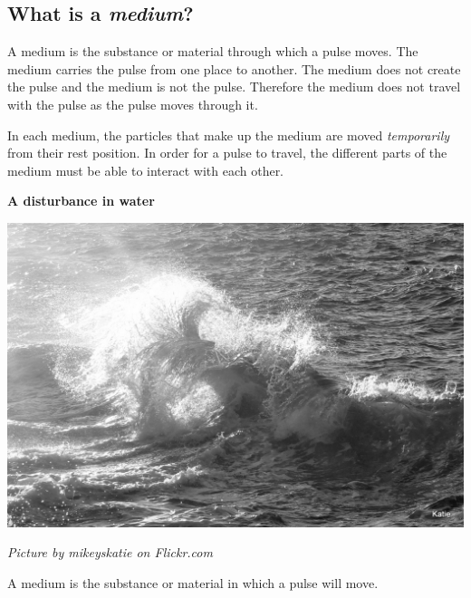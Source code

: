             \subsection*{What is a \textsl{medium}?}
            \nopagebreak
\begin{minipage}{.5\textwidth}
      \label{m38801*id312816}A medium is the substance or material through which a pulse moves. The medium carries the pulse from one place to another. The medium does not create the pulse and the medium is not the pulse. Therefore the medium does not travel with the pulse as the pulse moves through it. \par %
\label{m38801*id312841}In each medium, the particles that make up the medium are moved \textsl{temporarily} from their rest position. In order for a pulse to travel, the different parts of the medium must be able to interact with each other.\par 

\end{minipage}
\begin{minipage}{.5\textwidth}
\begin{center}
\textbf{A disturbance in water}\par
 \includegraphics[width=.8\textwidth]{photos/waveby-mikeyskatie-flickr.jpg}\par
\textit{\small Picture by mikeyskatie on Flickr.com}
\end{center}
\end{minipage}


\label{m38801*fhsst!!!underscore!!!id51}


\pagebreak      
    \label{m38801*cid4}
 { A medium is the substance or material in which a pulse will move. } 
           
